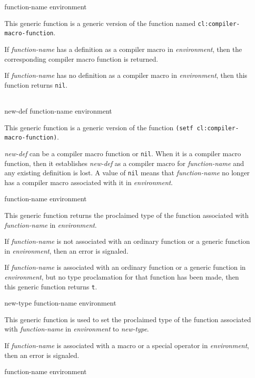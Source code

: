  {function-name environment}

This generic function is a generic version of the \commonlisp{}
function named \texttt{cl:compiler-macro-function}.

If \textit{function-name} has a definition as a compiler macro in
\textit{environment}, then the corresponding compiler macro function
is returned.

If \textit{function-name} has no definition as a compiler macro in
\textit{environment}, then this function returns \texttt{nil}.

\\
{new-def function-name environment}

This generic function is a generic version of the \commonlisp{}
function \texttt{(setf cl:compiler-macro-function)}.

\textit{new-def} can be a compiler macro function or \texttt{nil}.
When it is a compiler macro function, then it establishes
\textit{new-def} as a compiler macro for \textit{function-name} and
any existing definition is lost.  A value of \texttt{nil} means that
\textit{function-name} no longer has a compiler macro associated with
it in \textit{environment}.

 {function-name environment}

This generic function returns the proclaimed type of the function
associated with \textit{function-name} in \textit{environment}.

If \textit{function-name} is not associated with an ordinary function
or a generic function in \textit{environment}, then an error is
signaled.

If \textit{function-name} is associated with an ordinary function or a
generic function in \textit{environment}, but no type proclamation for
that function has been made, then this generic function returns
\texttt{t}.

 {new-type function-name environment}

This generic function is used to set the proclaimed type of the
function associated with \textit{function-name} in
\textit{environment} to \textit{new-type}.

If \textit{function-name} is associated with a macro or a special
operator in \textit{environment}, then an error is signaled.

 {function-name environment}

